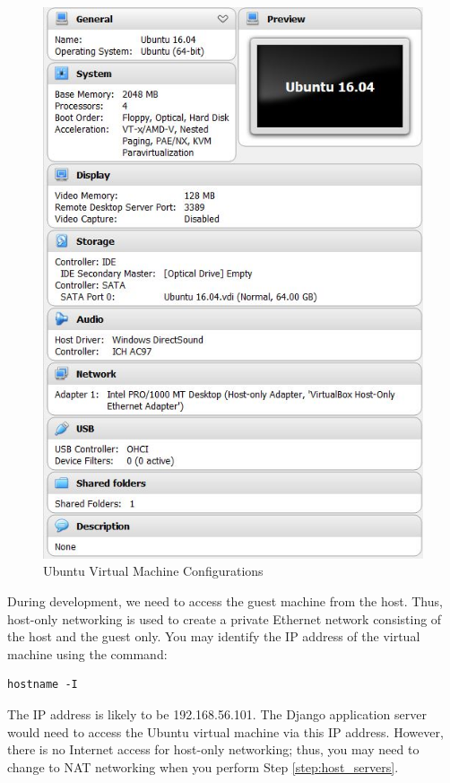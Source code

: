 \begin{figure}[!htbp]
  \includegraphics[width=.9\textwidth]{appendix/vm_config.jpg}
  \caption{Ubuntu Virtual Machine Configurations}
  \label{fig:vm_config}
\end{figure}

During development, we need to access the guest machine from the host. Thus, host-only networking is used to create a private Ethernet network consisting of the host and the guest only. You may identify the IP address of the virtual machine using the command:
\begin{verbatim}
hostname -I
\end{verbatim}

The IP address is likely to be 192.168.56.101. The Django application server would need to access the Ubuntu virtual machine via this IP address. However, there is no Internet access for host-only networking; thus, you may need to change to NAT networking when you perform Step \ref{step:host_servers}.


